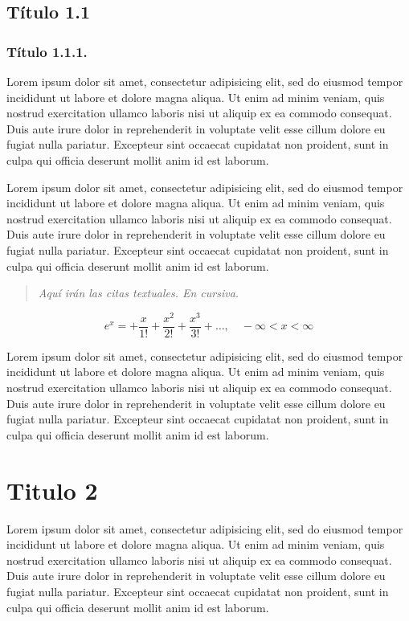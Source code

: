 \documentclass[a4paper,10pt,twoside]{article}
\begin{document}
\subsection{Título 1.1}
\subsubsection{Título 1.1.1.}
Lorem ipsum dolor sit amet, consectetur adipisicing elit, sed do eiusmod tempor incididunt ut labore 
et dolore magna aliqua. Ut enim ad minim veniam, quis nostrud exercitation ullamco laboris nisi ut 
aliquip ex ea commodo consequat. Duis aute irure dolor in reprehenderit in voluptate velit esse cillum 
dolore eu fugiat nulla pariatur. Excepteur sint occaecat cupidatat non proident, sunt in culpa qui 
officia deserunt mollit anim id est laborum. 

Lorem ipsum dolor sit amet, consectetur adipisicing elit, sed do eiusmod tempor incididunt ut labore 
et dolore magna aliqua. Ut enim ad minim veniam, quis nostrud exercitation ullamco laboris nisi ut 
aliquip ex ea commodo consequat. Duis aute irure dolor in reprehenderit in voluptate velit esse cillum 
dolore eu fugiat nulla pariatur. Excepteur sint occaecat cupidatat non proident, sunt in culpa qui 
officia deserunt mollit anim id est laborum. 

\begin{quote}
\emph{Aquí irán las citas textuales. En cursiva.}
\end{quote}

$$e^x=+\frac{x}{1!}+\frac{x^2}{2!}+\frac{x^3}{3!}+\ldots,\quad -\infty<x<\infty$$

Lorem ipsum dolor sit amet, consectetur adipisicing elit, sed do eiusmod tempor incididunt ut labore 
et dolore magna aliqua. Ut enim ad minim veniam, quis nostrud exercitation ullamco laboris nisi ut 
aliquip ex ea commodo consequat. Duis aute irure dolor in reprehenderit in voluptate velit esse cillum 
dolore eu fugiat nulla pariatur. Excepteur sint occaecat cupidatat non proident, sunt in culpa qui 
officia deserunt mollit anim id est laborum.





\section{Titulo 2}
Lorem ipsum dolor sit amet, consectetur adipisicing elit, sed do eiusmod tempor incididunt ut labore 
et dolore magna aliqua. Ut enim ad minim veniam, quis nostrud exercitation ullamco laboris nisi ut 
aliquip ex ea commodo consequat. Duis aute irure dolor in reprehenderit in voluptate velit esse cillum 
dolore eu fugiat nulla pariatur. Excepteur sint occaecat cupidatat non proident, sunt in culpa qui 
officia deserunt mollit anim id est laborum.
\end{document}
